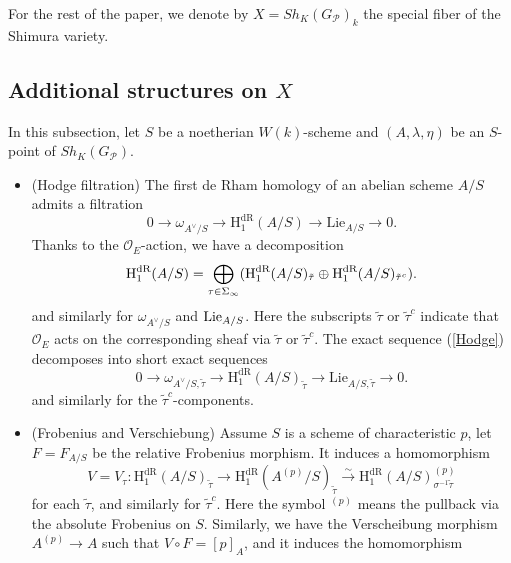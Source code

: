 \documentclass{article}
\begin{document}
For the rest of the paper, we denote by $X=Sh_K(G_\mathcal{P})_k$ the special fiber of the Shimura variety.


\subsection{Additional structures on $X$}

In this subsection, let $S$ be a noetherian $W(k)$-scheme and $(A,\lambda,\eta)$ be an $S$-point of $Sh_K(G_{\mathcal{P}})$.

\begin{itemize}
	\item (Hodge filtration) The first de Rham homology of an abelian scheme $A/S$ admits a filtration
		\begin{equation}\label{Hodge}
			0\longrightarrow \omega_{A^\vee/ S}\longrightarrow \mathrm{H}_1^{\mathrm{dR}}(A/S)\longrightarrow \text{Lie}_{A/S}\longrightarrow 0.
		\end{equation}
Thanks to the $\mathcal{O}_E$-action, we have a decomposition 
\begin{equation}
\textnormal{H}_1^{\textnormal{dR}}(A/S)=\bigoplus_{\tau\in\Sigma_\infty}(\textnormal{H}_1^{\textnormal{dR}}(A/S)_{\tilde\tau}\oplus \textnormal{H}_1^{\textnormal{dR}}(A/S)_{\tilde\tau^c}). 
\end{equation}
and similarly for $\omega_{A^\vee/S}$ and $\textnormal{Lie}_{A/S}$. Here the subscripts $\tilde\tau$ or $\tilde\tau^c$ indicate that $\mathcal{O}_E$ acts on the corresponding sheaf via $\tilde\tau$ or $\tilde\tau^c$. The exact sequence (\ref{Hodge}) decomposes into short exact sequences
\begin{equation}
0\longrightarrow \omega_{A^\vee/ S,\tilde\tau}\longrightarrow \mathrm{H}_1^{\mathrm{dR}}(A/S)_{\tilde\tau}\longrightarrow \text{Lie}_{A/S,\tilde\tau}\longrightarrow 0.
\end{equation}
and similarly for the $\tilde\tau^c$-components.
	\item (Frobenius and Verschiebung) Assume $S$ is a scheme of characteristic $p$, let $F=F_{A/S}$ be the relative Frobenius morphism. It induces a homomorphism 
		\begin{equation}
			V=V_\tau:\mathrm{H}^{\mathrm{dR}}_1(A/S)_{\tilde\tau}\longrightarrow \mathrm{H^{dR}_1}(A^{(p)}/S)_{\tilde\tau}\stackrel{\sim}{\longrightarrow} \mathrm{H}^{\mathrm{dR}}_1(A/S)_{\sigma^{-1}\tilde\tau}^{(p)}
		\end{equation}
for each $\tilde\tau$, and similarly for $\tilde\tau^c$. Here the symbol $^{(p)}$ means the pullback via the absolute Frobenius on $S$. Similarly, we have the Verscheibung morphism $A^{(p)}\to A$ such that $V\circ F=[p]_A$, and it induces the homomorphism

\end{itemize}
\end{document}
